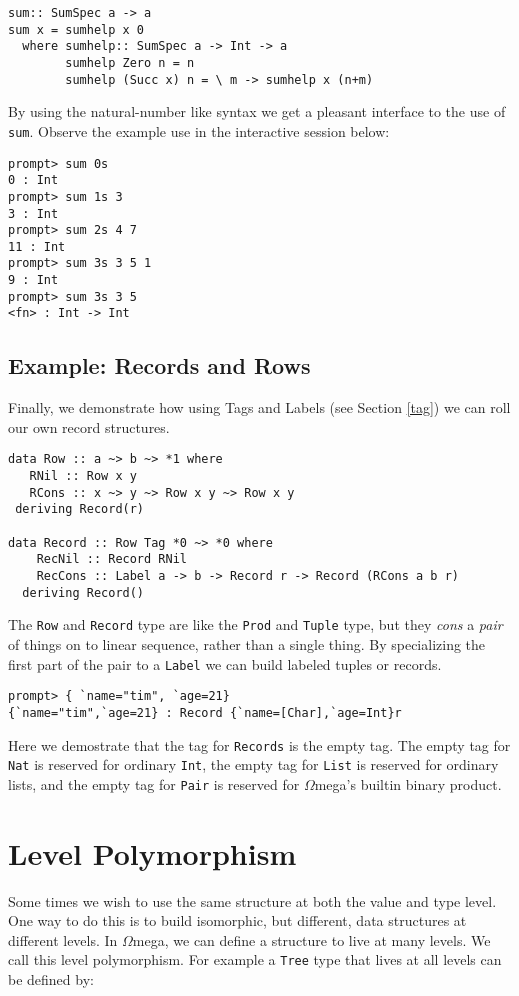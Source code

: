 \documentclass[11pt,twoside]{article}
\newcommand{\om}{$\Omega$mega}
\begin{document}
\begin{verbatim}
sum:: SumSpec a -> a
sum x = sumhelp x 0
  where sumhelp:: SumSpec a -> Int -> a
        sumhelp Zero n = n
        sumhelp (Succ x) n = \ m -> sumhelp x (n+m)
\end{verbatim}        
By using the natural-number like syntax we get a pleasant interface to
the use of {\tt sum}. Observe the example use in the interactive session
below:
\begin{verbatim}
prompt> sum 0s
0 : Int
prompt> sum 1s 3
3 : Int
prompt> sum 2s 4 7
11 : Int
prompt> sum 3s 3 5 1
9 : Int
prompt> sum 3s 3 5
<fn> : Int -> Int
\end{verbatim}

\subsection{Example: Records and Rows}
Finally, we demonstrate how using Tags and Labels (see Section \ref{tag})
we can roll our own record structures. 

\begin{verbatim}
data Row :: a ~> b ~> *1 where
   RNil :: Row x y
   RCons :: x ~> y ~> Row x y ~> Row x y
 deriving Record(r)

data Record :: Row Tag *0 ~> *0 where
    RecNil :: Record RNil
    RecCons :: Label a -> b -> Record r -> Record (RCons a b r)
  deriving Record()
\end{verbatim} 
The {\tt Row} and {\tt Record} type are like the {\tt Prod} and
{\tt Tuple} type, but they {\it cons} a {\it pair} of things on to
linear sequence, rather than a single thing. By specializing
the first part of the pair to a {\tt Label} we can build labeled
tuples or records.

\begin{verbatim}
prompt> { `name="tim", `age=21}
{`name="tim",`age=21} : Record {`name=[Char],`age=Int}r
\end{verbatim} 

Here we demostrate that the tag for {\tt Records} is the empty tag.
The empty tag for {\tt Nat} is reserved for ordinary {\tt Int},
the empty tag for {\tt List} is reserved for ordinary lists,
and the empty tag for {\tt Pair} is reserved for \om's builtin binary
product.

\section{Level Polymorphism}
Some times we wish to use the same structure at both the value and type level.
One way to do this is to build isomorphic, but different, data structures
at different levels. In \om, we can define a structure to live
at many levels. We call this level polymorphism. For example
a {\tt Tree} type that lives at all levels can be defined by:
\end{document}
